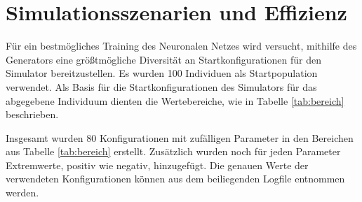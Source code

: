 \chapter{Simulationsszenarien und Effizienz}

Für ein bestmögliches Training des Neuronalen Netzes wird versucht, mithilfe des Generators eine größtmögliche Diversität an Startkonfigurationen für den Simulator bereitzustellen. Es wurden 100 Individuen als Startpopulation verwendet. Als Basis für die Startkonfigurationen des Simulators für das abgegebene Individuum dienten die Wertebereiche, wie in Tabelle \ref{tab:bereich} beschrieben.


Insgesamt wurden 80 Konfigurationen mit zufälligen Parameter in den Bereichen aus Tabelle \ref{tab:bereich} erstellt. Zusätzlich wurden noch für jeden Parameter Extremwerte, positiv wie negativ, hinzugefügt. Die genauen Werte der verwendeten Konfigurationen können aus dem beiliegenden Logfile entnommen werden.

